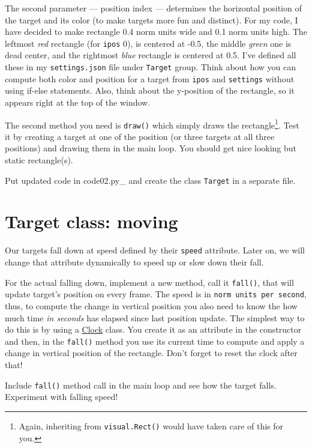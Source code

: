 \documentclass[
]{book}
\begin{document}
The second parameter --- position index --- determines the horizontal position of the target and its color (to make targets more fun and distinct). For my code, I have decided to make rectangle 0.4 norm units wide and 0.1 norm units high. The leftmost \emph{red} rectangle (for \texttt{ipos} 0), is centered at -0.5, the middle \emph{green} one is dead center, and the rightmost \emph{blue} rectangle is centered at 0.5. I've defined all these in my \texttt{settings.json} file under \texttt{Target} group. Think about how you can compute both color and position for a target from \texttt{ipos} and \texttt{settings} without using if-else statements. Also, think about the y-position of the rectangle, so it appears right at the top of the window.

The second method you need is \texttt{draw()} which simply draws the rectangle\footnote{Again, inheriting from \texttt{visual.Rect()} would have taken care of this for you.}. Test it by creating a target at one of the position (or three targets at all three positions) and drawing them in the main loop. You should get nice looking but static rectangle(s).

Put updated code in code02.py\_ and create the class \texttt{Target} in a separate file.

\hypertarget{target-class-moving}{%
\section{Target class: moving}\label{target-class-moving}}

Our targets fall down at speed defined by their \texttt{speed} attribute. Later on, we will change that attribute dynamically to speed up or slow down their fall.

For the actual falling down, implement a new method, call it \texttt{fall()}, that will update target's position on every frame. The speed is in \texttt{norm\ units\ per\ second}, thus, to compute the change in vertical position you also need to know the how much time \emph{in seconds} has elapsed since last position update. The simplest way to do this is by using a \href{https://psychopy.org/api/clock.html\#psychopy.clock.Clock}{Clock} class. You create it as an attribute in the constructor and then, in the \texttt{fall()} method you use its current time to compute and apply a change in vertical position of the rectangle. Don't forget to reset the clock after that!

Include \texttt{fall()} method call in the main loop and see how the target falls. Experiment with falling speed!
\end{document}

